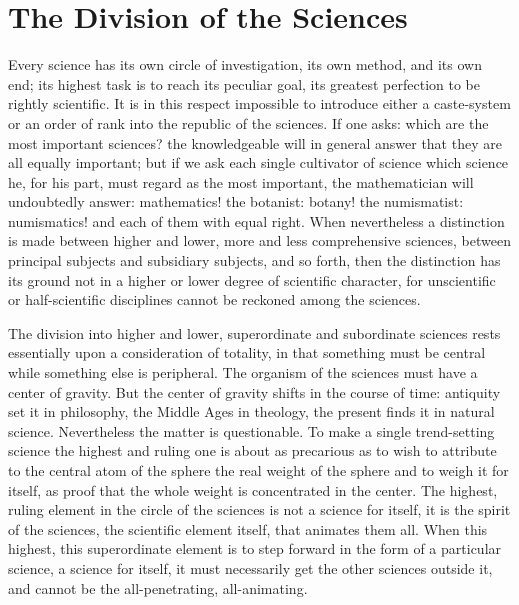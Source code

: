 \documentclass[12pt]{book}
\begin{document}
\section{The Division of the Sciences}
\label{sec:10}

\noindent Every science has its own circle of investigation, its own method, and
its own end; its highest task is to reach its peculiar goal, its greatest
perfection to be rightly scientific. It is in this respect impossible to
introduce either a caste-system or an order of rank into the republic of the
sciences. If one asks: which are the most important sciences? the knowledgeable
will in general answer that they are all equally important; but if we ask each
single cultivator of science which science he, for his part, must regard as the
most important, the mathematician will undoubtedly answer: mathematics! the
botanist: botany! the numismatist: numismatics! and each of them with equal
right. When nevertheless a distinction is made between higher and lower, more and
less comprehensive sciences, between principal subjects and subsidiary subjects,
and so forth, then the distinction has its ground not in a higher or lower
degree of scientific character, for unscientific or half-scientific disciplines
cannot be reckoned among the sciences.

The division into higher and lower, superordinate and subordinate sciences rests
essentially upon a consideration of totality, in that something must be central
while something else is peripheral. The organism of the sciences must have a
center of gravity. But the center of gravity shifts in the course of time:
antiquity set it in philosophy, the Middle Ages in theology, the present finds
it in natural science. Nevertheless the matter is questionable. To make a single
trend-setting science the highest and ruling one is about as precarious as to
wish to attribute to the central atom of the sphere the real weight of the
sphere and to weigh it for itself, as proof that the whole weight is concentrated
in the center. The highest, ruling element in the circle of the sciences is not a
science for itself, it is the spirit of the sciences, the scientific element
itself, that animates them all. When this highest, this superordinate element is
to step forward in the form of a particular science, a science for itself, it
must necessarily get the other sciences outside it, and cannot be the
all-penetrating, all-animating.
\end{document}

